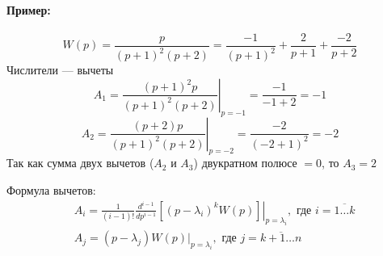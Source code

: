 \paragraph{Пример:}
\[
  W(p) = \frac{p}{(p+1)^2 (p+2)} = \frac{-1}{(p+1)^2} + \frac{2}{p+1} +
  \frac{-2}{p+2}
\] 
Числители --- вычеты
\[
  A_1 = \left.\frac{(p+1)^2p}{(p+1)^2(p+2)}\right|_{p=-1} = \frac{-1}{-1 + 2} =
    -1
\] 
\[
  A_2 = \left.\frac{(p+2)p}{(p+1)^2(p+2)}\right|_{p=-2} = \frac{-2}{(-2+1)^2} =
    -2
\] 
Так как сумма двух вычетов ($A_2$ и $A_3$) двукратном полюсе $= 0$, то $A_3 =
2$\par
\centerline{\hfill\hrulefill\hrulefill\hrulefill\hrulefill\hrulefill\hfill}
Формула вычетов:
\[
\begin{aligned}
    &A_i = \frac{1}{(i-1)!} \frac{d^{i-1}}{dp^{i-1}}\left.
      [(p-\lambda_i)^{k}W(p)]\right|_{p=\lambda_i}, \text{ где  } i = \overline{1 \ldots k}\\
  &A_j = (p-\lambda_j)\left.W(p)\right|_{p=\lambda_i}, \text{ где } j =
    \overline{k+1 \ldots n}
\end{aligned}
\] 
\centerline{\hfill\hrulefill\hrulefill\hrulefill\hrulefill\hrulefill\hfill}

